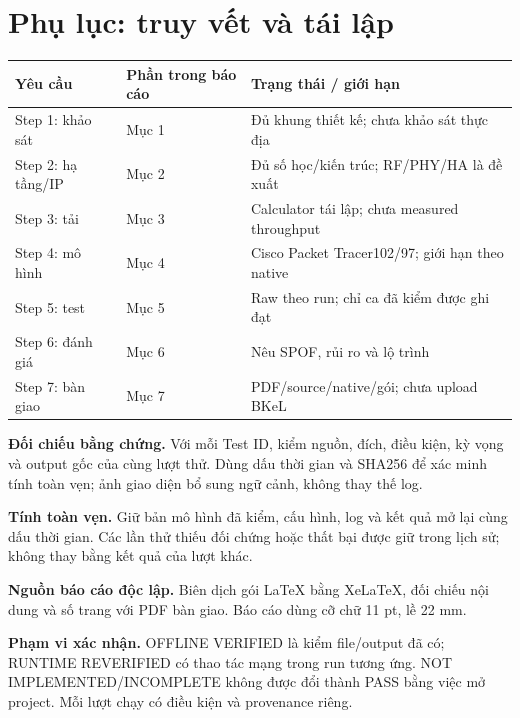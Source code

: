 \documentclass[
  11pt,
]{article}
\begin{document}
\section*{Phụ lục: truy vết và tái lập}
\par\noindent
{}
\begin{tabularx}{\linewidth}{@{}lXX@{}}\toprule
Yêu cầu & Phần trong báo cáo & Trạng thái / giới hạn\\\midrule
Step 1: khảo sát & Mục 1 & Đủ khung thiết kế; chưa khảo sát thực địa\\
Step 2: hạ tầng/IP & Mục 2 & Đủ số học/kiến trúc; RF/PHY/HA là đề xuất\\
Step 3: tải & Mục 3 & Calculator tái lập; chưa measured throughput\\
Step 4: mô hình & Mục 4 & Cisco Packet Tracer102/97; giới hạn theo native\\
Step 5: test & Mục 5 & Raw theo run; chỉ ca đã kiểm được ghi đạt\\
Step 6: đánh giá & Mục 6 & Nêu SPOF, rủi ro và lộ trình\\
Step 7: bàn giao & Mục 7 & PDF/source/native/gói; chưa upload BKeL\\\bottomrule\end{tabularx}\par

\textbf{Đối chiếu bằng chứng.} Với mỗi Test ID, kiểm nguồn, đích, điều kiện, kỳ vọng và output gốc của cùng lượt thử. Dùng dấu thời gian và SHA256 để xác minh tính toàn vẹn; ảnh giao diện bổ sung ngữ cảnh, không thay thế log.

\textbf{Tính toàn vẹn.} Giữ bản mô hình đã kiểm, cấu hình, log và kết quả mở lại cùng dấu thời gian. Các lần thử thiếu đối chứng hoặc thất bại được giữ trong lịch sử; không thay bằng kết quả của lượt khác.

\textbf{Nguồn báo cáo độc lập.} Biên dịch gói LaTeX bằng XeLaTeX, đối chiếu nội dung và số trang với PDF bàn giao. Báo cáo dùng cỡ chữ 11 pt, lề 22 mm.

\textbf{Phạm vi xác nhận.} OFFLINE VERIFIED là kiểm file/output đã có; RUNTIME REVERIFIED có thao tác mạng trong run tương ứng. NOT IMPLEMENTED/INCOMPLETE không được đổi thành PASS bằng việc mở project. Mỗi lượt chạy có điều kiện và provenance riêng.
\end{document}
